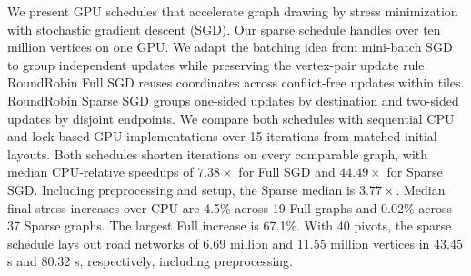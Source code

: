 We present GPU schedules that accelerate graph drawing by stress minimization with stochastic gradient descent (SGD). Our sparse schedule handles over ten million vertices on one GPU.
We adapt the batching idea from mini-batch SGD to group independent updates while preserving the vertex-pair update rule.
RoundRobin Full SGD reuses coordinates across conflict-free updates within tiles. RoundRobin Sparse SGD groups one-sided updates by destination and two-sided updates by disjoint endpoints.
We compare both schedules with sequential CPU and lock-based GPU implementations over 15 iterations from matched initial layouts.
Both schedules shorten iterations on every comparable graph, with median CPU-relative speedups of $7.38\times$ for Full SGD and $44.49\times$ for Sparse SGD. Including preprocessing and setup, the Sparse median is $3.77\times$.
Median final stress increases over CPU are 4.5\% across 19 Full graphs and 0.02\% across 37 Sparse graphs. The largest Full increase is 67.1\%.
With 40 pivots, the sparse schedule lays out road networks of 6.69 million and 11.55 million vertices in 43.45 s and 80.32 s, respectively, including preprocessing.
